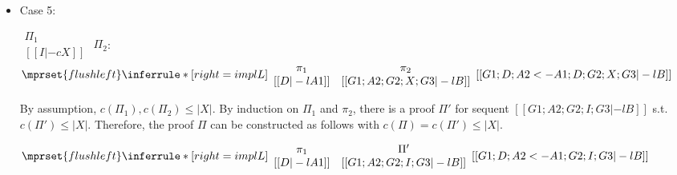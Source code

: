 \begin{itemize}
\item Case 5:
      \begin{center}
        \scriptsize
        \begin{math}
          \begin{array}{c}
            \Pi_1 \\
            {[[I |-c X]]}
          \end{array}
        \end{math}
        \qquad\qquad
        $\Pi_2$:
        \begin{math}
          $$\mprset{flushleft}
          \inferrule* [right={\tiny implL}] {
            {
              \begin{array}{cc}
                \pi_1 & \pi_2 \\
                {[[D |-l A1]]} & {[[G1; A2; G2; X; G3 |-l B]]}
              \end{array}
            }
          }{[[G1; D; A2 <- A1; D; G2; X; G3 |-l B]]}
        \end{math}
      \end{center}
      By assumption, $c(\Pi_1),c(\Pi_2)\leq |X|$. By induction on $\Pi_1$
      and $\pi_2$, there is a proof $\Pi'$ for sequent
      $[[G1; A2; G2; I; G3 |-l B]]$ s.t. $c(\Pi') \leq |X|$. Therefore, the
      proof $\Pi$ can be constructed as follows with
      $c(\Pi) = c(\Pi') \leq |X|$.
      \begin{center}
        \scriptsize
        \begin{math}
          $$\mprset{flushleft}
          \inferrule* [right={\tiny implL}] {
            {
              \begin{array}{cc}
                \pi_1 & \Pi' \\
                {[[D |-l A1]]} & {[[G1; A2; G2; I; G3 |-l B]]}
              \end{array}
            }
          }{[[G1; D; A2 <- A1; G2; I; G3 |-l B]]}
        \end{math}
      \end{center}


\end{itemize}
